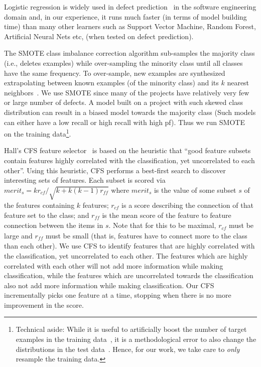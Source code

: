 \documentclass[10pt,journal,compsoc]{IEEEtran}
\newcommand{\respto}[1]{
\fcolorbox{black}{black!15}{%
\label{resp:#1}%
\bf\scriptsize R{#1}}}
\begin{document}
Logistic regression  \respto{1-5a} {\color{blue}  is widely used in defect prediction~\cite{ghotra2015revisiting,zhang2017data,he2012investigation,nam2013transfer,pan2010domain} in the software engineering domain and, in our experience,
it runs much faster (in terms of model building time) than many other learners such as Support Vector Machine, Random Forest, Artificial Neural Nets etc, (when tested on defect prediction).}

\respto{1-5b} {\color{blue} The SMOTE class imbalance correction algorithm sub-samples the majority class (i.e., deletes examples) while over-sampling the minority class until all classes have the same frequency. To over-sample, new examples are synthesized extrapolating between known examples (of the minority class) and its $k$ nearest neighbors~\cite{Chawla2002}.
We use SMOTE since many of the projects have relatively very few or large number of defects. A model built on a project with such skewed class distribution can result in a biased model towards the majority class (Such models can either have a low recall or high recall with high pf). Thus we run SMOTE~\cite{tan2015online,wang2013using,sun2012using,khoshgoftaar2010attribute} on the training data\footnote{Technical aside: While it is useful
  to artificially boost the number of target examples
in the training data~\cite{Chawla2002,Pelayo2007,mensah2017investigating}, it is a methodological error to also change the distributions in   the test data~\cite{agrawal17}. Hence, for our work,
we take care to {\em only} resample the training data.}}.

\respto{1-5c} {\color{blue} Hall's
CFS feature selector~\cite{hall1999correlation} 
is based on the heuristic
that ``good feature subsets contain features highly correlated with the classification, yet uncorrelated to each other''. Using this heuristic,
CFS performs a best-first search  to discover interesting sets of features.
Each subset is  scored via
$\mathit{merit}_s = kr_{\mathit{cf}}/\sqrt{k+k(k-1)r_{\mathit{ff}}}$
where
$\mathit{merit}_s$ is the value of some subset $s$ of the
features containing $k$ features; 
$r_{\mathit{cf}}$ is a score describing the connection of that feature
set to the class;
and $r_{\mathit{ff}}$ is the mean score of the feature to feature
connection between the items in $s$.
Note that for this to be maximal, $r_{\mathit{cf}}$  must be large
and $r_{\mathit{ff}}$ must be small (that is, features have to connect more to the class than each other). We use CFS  to identify features that are highly correlated with the classification, yet uncorrelated to each other. The features which are  highly correlated with each other will not add more information while making classification, while the features which are uncorrelated towards the classification also not add more information while making classification.  Our  CFS   incrementally picks one feature at a time, stopping when there is no more improvement in the score. }
\end{document}

